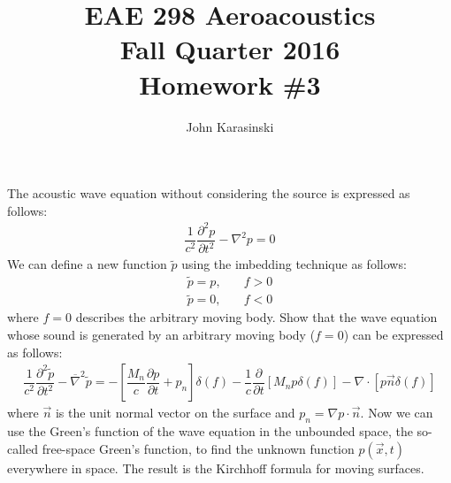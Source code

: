 \documentclass[onecolumn,10pt]{jhwhw}
\author{John Karasinski}
\title{EAE 298 Aeroacoustics \\ Fall Quarter 2016 \\ Homework \#3}
\begin{document}
\maketitle

\problem{[50 points]}
The acoustic wave equation without considering the source is expressed as follows:
\begin{align*}
\dfrac{1}{c^2} \dfrac{\partial^2 p}{\partial t^2} - \nabla^2 p = 0
\end{align*}
We can define a new function $\widetilde{p}$ using the imbedding technique as follows:
\begin{align*}
\widetilde{p} = p, & \hspace{1em} f > 0 \\
\widetilde{p} = 0, & \hspace{1em} f < 0
\end{align*}
where $f=0$ describes the arbitrary moving body. Show that the wave equation whose sound is generated by an arbitrary moving body ($f=0$) can be expressed as follows:
\begin{align*}
\dfrac{1}{c^2} \dfrac{\partial^2 \widetilde{p}}{\partial t^2}
- \overline{\nabla}^2 \widetilde{p}
= - \left [ \dfrac{M_n}{c} \dfrac{\partial p}{\partial t} + p_n \right] \delta (f)
- \dfrac{1}{c} \dfrac{\partial}{\partial t} \left[ M_n p \delta(f) \right]
- \nabla \cdot \left[ p \vec{n} \delta (f) \right]
\end{align*}
where $\vec{n}$ is the unit normal vector on the surface and $p_n = \nabla p \cdot \vec{n}$. Now we can use the Green’s function of the wave equation in the unbounded space, the so-called free-space Green’s function, to find the unknown function $p(\vec{x}, t)$ everywhere in space. The result is the Kirchhoff formula for moving surfaces.
\end{document}
